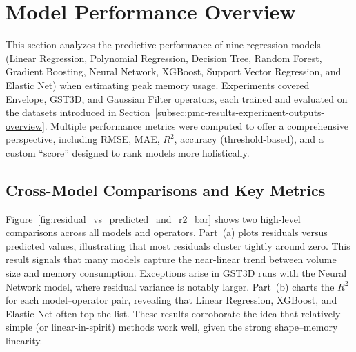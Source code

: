 \section{Model Performance Overview}
\label{sec:pmc-results-model-performance-overview}

This section analyzes the predictive performance of nine regression models (Linear Regression, Polynomial Regression, Decision Tree, Random Forest, Gradient Boosting, Neural Network, XGBoost, Support Vector Regression, and Elastic Net) when estimating peak memory usage.
Experiments covered Envelope, \ac{GST3D}, and Gaussian Filter operators, each trained and evaluated on the datasets introduced in Section~\ref{subsec:pmc-results-experiment-outputs-overview}.
Multiple performance metrics were computed to offer a comprehensive perspective, including \ac{RMSE}, \ac{MAE}, $R^2$, accuracy (threshold-based), and a custom “score” designed to rank models more holistically.

\subsection{Cross-Model Comparisons and Key Metrics}
\label{subsec:cross-model-comparisons-and-key-metrics}

Figure~\ref{fig:residual_vs_predicted_and_r2_bar} shows two high-level comparisons across all models and operators.
Part~(a) plots residuals versus predicted values, illustrating that most residuals cluster tightly around zero.
This result signals that many models capture the near-linear trend between volume size and memory consumption.
Exceptions arise in \ac{GST3D} runs with the Neural Network model, where residual variance is notably larger.
Part~(b) charts the $R^2$ for each model--operator pair, revealing that Linear Regression, XGBoost, and Elastic Net often top the list.
These results corroborate the idea that relatively simple (or linear-in-spirit) methods work well, given the strong shape--memory linearity.

